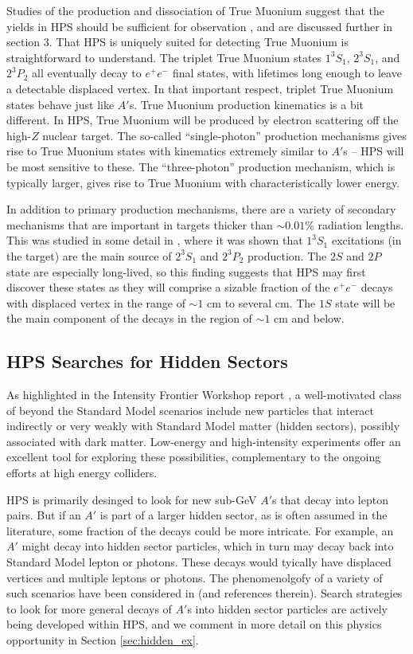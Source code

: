 Studies of the production and dissociation of True Muonium suggest
that the yields in HPS should be sufficient for observation
\cite{Banburski:2012tk}, and are discussed further in section 3. That
HPS is uniquely suited for detecting True Muonium is straightforward
to understand.
The triplet True Muonium states $1^3S_1$, $2^3S_1$, and $2^3P_2$ all
eventually decay
to $e^+e^-$ final states, with lifetimes long enough to leave a
detectable displaced vertex.
In that important respect, triplet True Muonium states behave just like $A'$s.
True Muonium production kinematics is a bit different.
In HPS, True Muonium will be produced by electron scattering off the
high-$Z$ nuclear target.
The so-called ``single-photon'' production mechanisms gives rise to
True Muonium states with kinematics extremely similar to $A'$s -- HPS
will be most
sensitive to these. The ``three-photon'' production mechanism, which
is typically larger, gives rise to True Muonium with
characteristically lower energy. 
 
In addition to primary production mechanisms, there are a variety of secondary mechanisms
that are important in targets thicker than $\sim0.01\%$ radiation lengths.
This was studied in some detail in \cite{Banburski:2012tk}, where it was 
shown that $1^3S_1$ excitations (in the target) are the main source of 
$2^3S_1$ and $2^3P_2$ production.
The $2S$ and $2P$ state are especially long-lived, so this finding
suggests that HPS may first discover these states as they will comprise 
a sizable fraction of the $e^+e^-$ decays with displaced vertex in the range of $\sim 1$ cm to several cm. 
The $1S$ state will be the main component of the decays in the region of  $\sim 1$ cm and below. 

\subsection{HPS Searches for Hidden Sectors}

As highlighted in the Intensity Frontier Workshop report \cite{Hewett:2012ns},
a well-motivated class of beyond the Standard Model scenarios include new particles that interact
indirectly or very weakly with Standard Model matter (hidden sectors), possibly associated with dark matter. 
Low-energy and high-intensity experiments offer an excellent tool for exploring these
possibilities, complementary to the ongoing efforts at high energy colliders. 

HPS is primarily desinged to look for new sub-GeV $A'$s that decay into lepton pairs.
But if an $A'$ is part of a larger hidden sector, as is often assumed in the literature, 
some fraction of the decays could be more intricate.
For example, an $A'$ might decay into hidden sector particles, which in turn may decay back into Standard Model lepton or photons.  
These decays would tyically have displaced vertices and multiple leptons or photons. The phenomenolgofy of a variety of such scenarios 
have been considered in \cite{Strassler:2006im, Essig:2009nc} (and references therein). 
Search strategies to look for more general decays of $A'$s into hidden sector particles are actively being developed within HPS, 
and we comment in more detail on this physics opportunity in Section \ref{sec:hidden_ex}.


